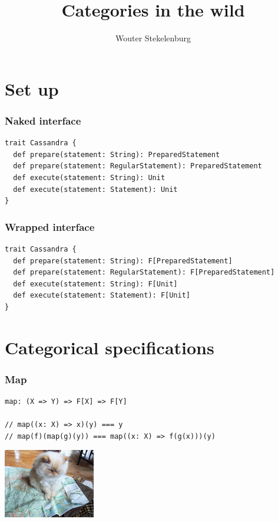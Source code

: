 \documentclass{beamer}
\title{Categories in the wild}
\author{Wouter Stekelenburg}
\newcommand\hide[1]{}
\begin{document}
\lstset{style=Scala}
\begin{frame}
  \titlepage
\end{frame}

\hide{
\begin{frame}[plain]
\frametitle{Categories are like \dots}
Categories are like cats. It is easy to learn what they are, but that doesn't mean you understand them or can work with them without getting hurt.
\end{frame}
}

\section{Set up}
\begin{frame}[fragile]
\frametitle{Naked interface}

\begin{lstlisting}
trait Cassandra {
  def prepare(statement: String): PreparedStatement
  def prepare(statement: RegularStatement): PreparedStatement
  def execute(statement: String): Unit
  def execute(statement: Statement): Unit
}
\end{lstlisting}

\end{frame}

\begin{frame}[fragile]
\frametitle{Wrapped interface}

\begin{lstlisting}
trait Cassandra {
  def prepare(statement: String): F[PreparedStatement]
  def prepare(statement: RegularStatement): F[PreparedStatement]
  def execute(statement: String): F[Unit]
  def execute(statement: Statement): F[Unit]
}
\end{lstlisting}

\end{frame}

\section{Categorical specifications}

\begin{frame}[fragile]
\frametitle{Map}
\begin{lstlisting}
map: (X => Y) => F[X] => F[Y]

// map((x: X) => x)(y) === y
// map(f)(map(g)(y)) === map((x: X) => f(g(x)))(y)
\end{lstlisting}
\begin{center} \includegraphics[width=4cm]{Map-Cat.jpg} \end{center}
\end{frame}
\end{document}
